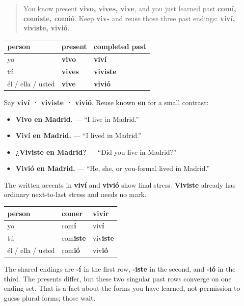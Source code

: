 \label{lesson:ES-C15-comer-vivir-preterite}



\begin{quote}
You know present \textbf{vivo, vives, vive}, and you just learned past \textbf{comí, comiste, comió}. Keep \textbf{viv-} and reuse those three past endings: \textbf{viví, viviste, vivió}.
\end{quote}

\begin{grammarlens}[title={Grammar Lens: one -ir singular past}]
\noindent
\begin{tabularx}{\linewidth}{@{}>{\raggedright\arraybackslash}X>{\raggedright\arraybackslash}X>{\raggedright\arraybackslash}X@{}}
\toprule
\textbf{person} & \textbf{present} & \textbf{completed past} \\
\midrule
yo & \textbf{vivo} & \textbf{viví} \\
tú & \textbf{vives} & \textbf{viviste} \\
él / ella / usted & \textbf{vive} & \textbf{vivió} \\
\bottomrule
\end{tabularx}

Say \textbf{viví · viviste · vivió}. Reuse known \textbf{en} for a small contrast:

\begin{itemize}
\raggedright
  \item \textbf{Vivo en Madrid.} — “I live in Madrid.”
  \item \textbf{Viví en Madrid.} — “I lived in Madrid.”
  \item \textbf{¿Viviste en Madrid?} — “Did you live in Madrid?”
  \item \textbf{Vivió en Madrid.} — “He, she, or you-formal lived in Madrid.”
\end{itemize}

The written accents in \textbf{viví} and \textbf{vivió} show final stress. \textbf{Viviste} already has ordinary next-to-last stress and needs no mark.
\end{grammarlens}

\begin{grammarlens}[title={Grammar Lens: -er and -ir meet in this past}]
\noindent
\begin{tabularx}{\linewidth}{@{}>{\raggedright\arraybackslash}X>{\raggedright\arraybackslash}X>{\raggedright\arraybackslash}X@{}}
\toprule
\textbf{person} & \textbf{\textbf{comer}} & \textbf{\textbf{vivir}} \\
\midrule
yo & com\textbf{í} & viv\textbf{í} \\
tú & com\textbf{iste} & viv\textbf{iste} \\
él / ella / usted & com\textbf{ió} & viv\textbf{ió} \\
\bottomrule
\end{tabularx}

The shared endings are \textbf{-í} in the first row, \textbf{-iste} in the second, and \textbf{-ió} in the third. The presents differ, but these two singular past rows converge on one ending set. That is a fact about the forms you have learned, not permission to guess plural forms; those wait.
\end{grammarlens}

